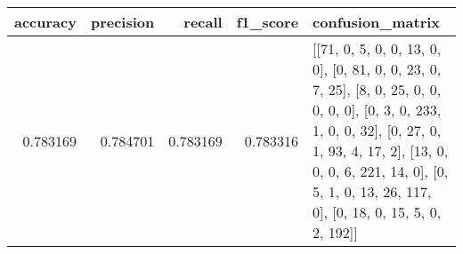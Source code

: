 \begin{tabular}{rrrrl}
\toprule
accuracy & precision & recall & f1_score & confusion_matrix \\
\midrule
0.783169 & 0.784701 & 0.783169 & 0.783316 & [[71, 0, 5, 0, 0, 13, 0, 0], [0, 81, 0, 0, 23, 0, 7, 25], [8, 0, 25, 0, 0, 0, 0, 0], [0, 3, 0, 233, 1, 0, 0, 32], [0, 27, 0, 1, 93, 4, 17, 2], [13, 0, 0, 0, 6, 221, 14, 0], [0, 5, 1, 0, 13, 26, 117, 0], [0, 18, 0, 15, 5, 0, 2, 192]] \\
\bottomrule
\end{tabular}
